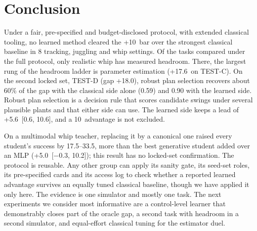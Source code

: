 \section{Conclusion}
\label{sec:conclusion}

Under a fair, pre-specified and budget-disclosed protocol, with extended classical tooling, no learned method cleared the +10\pp\ bar over the strongest classical baseline in 8 tracking, juggling and whip settings. Of the tasks compared under the full protocol, only realistic whip has measured headroom. There, the largest rung of the headroom ladder is parameter estimation (+17.6\pp\ on TEST-C). On the second locked set, TEST-D (gap +18.0\pp), robust plan selection recovers about 60\% of the gap with the classical side alone (0.59) and 0.90 with the learned side. Robust plan selection is a decision rule that scores candidate swings under several plausible plants and that either side can use. The learned side keeps a lead of +5.6\pp\ [0.6, 10.6], and a 10\pp\ advantage is not excluded.

On a multimodal whip teacher, replacing it by a canonical one raised every student's success by 17.5--33.5\pp, more than the best generative student added over an MLP (+5.0\pp\ [$-0.3$, 10.2]); this result has no locked-set confirmation. The protocol is reusable. Any other group can apply its sanity gate, its seed-set roles, its pre-specified cards and its access log to check whether a reported learned advantage survives an equally tuned classical baseline, though we have applied it only here. The evidence is one simulator and mostly one task. The next experiments we consider most informative are a control-level learner that demonstrably closes part of the oracle gap, a second task with headroom in a second simulator, and equal-effort classical tuning for the estimator duel.
